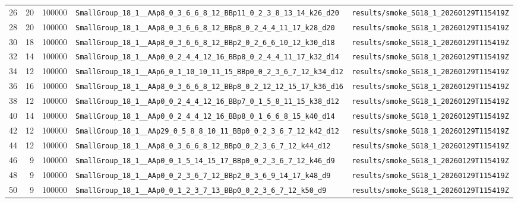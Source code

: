 \documentclass[11pt]{article}
\begin{document}
\begin{longtable}{@{}r r r l l@{}}
26 & 20 & 100000 & \texttt{SmallGroup\_18\_1\_\_AAp8\_0\_3\_6\_6\_8\_12\_BBp11\_0\_2\_3\_8\_13\_14\_k26\_d20} & \texttt{results/smoke\_SG18\_1\_20260129T115419Z} \\
28 & 20 & 100000 & \texttt{SmallGroup\_18\_1\_\_AAp8\_0\_3\_6\_6\_8\_12\_BBp8\_0\_2\_4\_4\_11\_17\_k28\_d20} & \texttt{results/smoke\_SG18\_1\_20260129T115419Z} \\
30 & 18 & 100000 & \texttt{SmallGroup\_18\_1\_\_AAp8\_0\_3\_6\_6\_8\_12\_BBp2\_0\_2\_6\_6\_10\_12\_k30\_d18} & \texttt{results/smoke\_SG18\_1\_20260129T115419Z} \\
32 & 14 & 100000 & \texttt{SmallGroup\_18\_1\_\_AAp0\_0\_2\_4\_4\_12\_16\_BBp8\_0\_2\_4\_4\_11\_17\_k32\_d14} & \texttt{results/smoke\_SG18\_1\_20260129T115419Z} \\
34 & 12 & 100000 & \texttt{SmallGroup\_18\_1\_\_AAp6\_0\_1\_10\_10\_11\_15\_BBp0\_0\_2\_3\_6\_7\_12\_k34\_d12} & \texttt{results/smoke\_SG18\_1\_20260129T115419Z} \\
36 & 16 & 100000 & \texttt{SmallGroup\_18\_1\_\_AAp8\_0\_3\_6\_6\_8\_12\_BBp8\_0\_2\_12\_12\_15\_17\_k36\_d16} & \texttt{results/smoke\_SG18\_1\_20260129T115419Z} \\
38 & 12 & 100000 & \texttt{SmallGroup\_18\_1\_\_AAp0\_0\_2\_4\_4\_12\_16\_BBp7\_0\_1\_5\_8\_11\_15\_k38\_d12} & \texttt{results/smoke\_SG18\_1\_20260129T115419Z} \\
40 & 14 & 100000 & \texttt{SmallGroup\_18\_1\_\_AAp0\_0\_2\_4\_4\_12\_16\_BBp8\_0\_1\_6\_6\_8\_15\_k40\_d14} & \texttt{results/smoke\_SG18\_1\_20260129T115419Z} \\
42 & 12 & 100000 & \texttt{SmallGroup\_18\_1\_\_AAp29\_0\_5\_8\_8\_10\_11\_BBp0\_0\_2\_3\_6\_7\_12\_k42\_d12} & \texttt{results/smoke\_SG18\_1\_20260129T115419Z} \\
44 & 12 & 100000 & \texttt{SmallGroup\_18\_1\_\_AAp8\_0\_3\_6\_6\_8\_12\_BBp0\_0\_2\_3\_6\_7\_12\_k44\_d12} & \texttt{results/smoke\_SG18\_1\_20260129T115419Z} \\
46 & 9 & 100000 & \texttt{SmallGroup\_18\_1\_\_AAp0\_0\_1\_5\_14\_15\_17\_BBp0\_0\_2\_3\_6\_7\_12\_k46\_d9} & \texttt{results/smoke\_SG18\_1\_20260129T115419Z} \\
48 & 9 & 100000 & \texttt{SmallGroup\_18\_1\_\_AAp0\_0\_2\_3\_6\_7\_12\_BBp2\_0\_3\_6\_9\_14\_17\_k48\_d9} & \texttt{results/smoke\_SG18\_1\_20260129T115419Z} \\
50 & 9 & 100000 & \texttt{SmallGroup\_18\_1\_\_AAp0\_0\_1\_2\_3\_7\_13\_BBp0\_0\_2\_3\_6\_7\_12\_k50\_d9} & \texttt{results/smoke\_SG18\_1\_20260129T115419Z} \\

\end{longtable}
\end{document}

